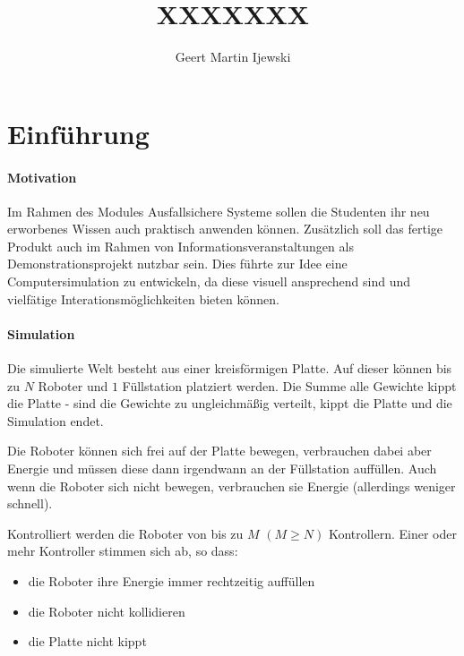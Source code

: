 \documentclass[
    12pt,
    bibliography=totoc,
    ngerman
]{scrartcl}
\title{XXXXXXX}
\author{Geert Martin Ijewski}
\begin{document}
\maketitle
{}
\thispagestyle{empty}

\clearpage
\tableofcontents
\listoffigures
\listoftables

\clearpage
\section{Einf{\"{u}}hrung}

\paragraph{Motivation} Im Rahmen des Modules Ausfallsichere Systeme sollen die Studenten ihr neu erworbenes Wissen auch praktisch anwenden k{\"{o}}nnen. 
Zus{\"{a}}tzlich soll das fertige Produkt auch im Rahmen von Informationsveranstaltungen als Demonstrationsprojekt nutzbar sein.
Dies f{\"{u}}hrte zur Idee eine Computersimulation zu entwickeln, da diese visuell ansprechend sind und vielf{\"{a}}tige
Interationsm{\"{o}}glichkeiten bieten k{\"{o}}nnen.

\paragraph{Simulation} Die simulierte Welt besteht aus einer kreisf{\"{o}}rmigen Platte. Auf dieser k{\"{o}}nnen bis zu $N$ Roboter und $1$ F{\"{u}}llstation
platziert werden. Die Summe alle Gewichte kippt die Platte - sind die Gewichte zu ungleichm{\"{a}}{\ss}ig verteilt, kippt
die Platte und die Simulation endet.

Die Roboter k{\"{o}}nnen sich frei auf der Platte bewegen, verbrauchen dabei aber Energie und m{\"{u}}ssen diese dann irgendwann
an der F{\"{u}}llstation auff{\"{u}}llen. Auch wenn die Roboter sich nicht bewegen, verbrauchen sie Energie (allerdings weniger
schnell).

Kontrolliert werden die Roboter von bis zu $M$ $(M \geq N)$ Kontrollern. Einer oder mehr Kontroller stimmen sich ab,
so dass:
\begin{itemize}
\item die Roboter ihre Energie immer rechtzeitig auff{\"{u}}llen
\item die Roboter nicht kollidieren
\item die Platte nicht kippt
\end{itemize}
\end{document}
